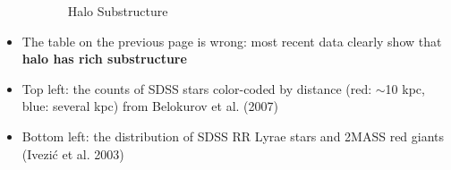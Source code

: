 \documentclass[letterpaper,landscape]{slides}
\begin{document}
\begin{slide}
{\begin{minipage}[t]{16cm}
\begin{center}
\vskip 1.1in
{\large \color{red} \,\,\,\,\,\,\,\,\,\,\,\,\,\,\,\,\,\,\,\,\,\,\,\,\,\,\,\,\,\, Halo Substructure }
\end{center}

\vskip 0.1in
\begin{itemize}
\item {\color{blue} The table on the previous page is wrong:} most recent
          data clearly show that {\bf halo has rich substructure}
\item {\color{blue} Top left:} the counts of SDSS stars color-coded by distance
                 (red: $\sim$10 kpc, blue: several kpc) from Belokurov et al. (2007)
\item {\color{blue} Bottom left:} the distribution of SDSS RR Lyrae stars
                 and 2MASS red giants (Ivezi\'{c} et al. 2003)
\end{itemize}

\end{minipage}}
\vfill 
\end{slide}
\end{document}
